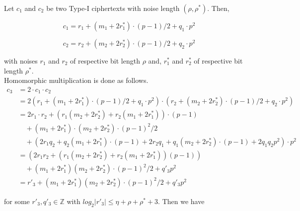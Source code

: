 \documentclass[../../main.tex]{subfiles}
\begin{document}
\noindent Let $c_1$ and $c_2$ be two Type-I ciphertexts with noise length $(\rho,\rho^*)$. Then,

\begin{equation*}
    c_1 = r_1 + (m_1 + 2r^*_1) \cdot (p-1)/2 + q_1 \cdot p^2
\end{equation*}

\begin{equation*}
    c_2 = r_2 + (m_2 + 2r^*_2) \cdot (p-1)/2 + q_2 \cdot p^2
\end{equation*}

\noindent with noises $r_1$ and $r_2$ of respective bit length $\rho$ and, $r^*_1$ and $r^*_2$ of respective bit length $\rho^*$.\\

\noindent Homomorphic multiplication is done as follows.
\begin{equation*}
    \begin{split}
        c_3 &= 2 \cdot c_1 \cdot c_2 \\
            &= 2 \left(r_1 + (m_1 + 2r^*_1) \cdot (p-1)/2 + q_1 \cdot p^2\right) \cdot \left(r_2 + (m_2 + 2r^*_2) \cdot (p-1)/2 + q_2 \cdot p^2\right) \\
            &= 2r_1 \cdot r_2 + (r_1(m_2 + 2r^*_2) + r_2(m_1 + 2r^*_1))\cdot (p-1)\\
            & \quad + (m_1 + 2r^*_1)\cdot(m_2 + 2r^*_2)\cdot(p-1)^2/2\\
            & \quad + (2r_1q_2 + q_2(m_1+2r^*_1)\cdot(p-1)
              + 2r_2q_1 + q_1(m_2 + 2r^*_2)\cdot(p-1)+2q_1q_2p^2)\cdot p^2\\
            &= (2r_1r_2 + (r_1(m_2 + 2r^*_2) + r_2(m_1 + 2r^*_1))(p-1))\\
            & \quad + (m_1+2r^*_1)(m_2+2r^*_2)\cdot(p-1)^2/2 + q'_3p^2\\
            &= r'_3 + (m_1 + 2r^*_1)(m_2 + 2r^*_2)\cdot(p-1)^2/2 + q'_3p^2
    \end{split}
\end{equation*}
    
\noindent for some $r'_3, q'_3 \in \mathbb{Z}$ with $log_2|r'_3| \leq \eta + \rho + \rho^* + 3$. Then we have
\end{document}
